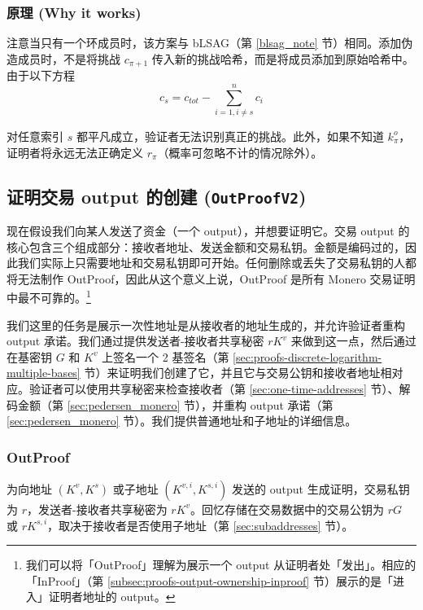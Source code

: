 \subsubsection*{原理 (Why it works)}

注意当只有一个环成员时，该方案与 bLSAG（第 \ref{blsag_note} 节）相同。添加伪造成员时，不是将挑战 $c_{\pi+1}$ 传入新的挑战哈希，而是将成员添加到原始哈希中。由于以下方程\vspace{.175cm}
\[c_{s} = c_{tot} - \sum^{n}_{i=1,i\neq s} c_i\]

对任意索引 $s$ 都平凡成立，验证者无法识别真正的挑战。此外，如果不知道 $k^o_{\pi}$，证明者将永远无法正确定义 $r_{\pi}$（概率可忽略不计的情况除外）。


\subsection{证明交易 output 的创建 ({\tt OutProofV2})}
\label{subsec:proofs-output-creator-outproof}

现在假设我们向某人发送了资金（一个 output），并想要证明它。交易 output 的核心包含三个组成部分：接收者地址、发送金额和交易私钥。金额是编码过的，因此我们实际上只需要地址和交易私钥即可开始。任何删除或丢失了交易私钥的人都将无法制作 OutProof，因此从这个意义上说，OutProof 是所有 Monero 交易证明中最不可靠的。\footnote{我们可以将「OutProof」理解为展示一个 output 从证明者处「发出」。相应的「InProof」（第 \ref{subsec:proofs-output-ownership-inproof} 节）展示的是「进入」证明者地址的 output。}

我们这里的任务是展示一次性地址是从接收者的地址生成的，并允许验证者重构 output 承诺。我们通过提供发送者-接收者共享秘密 $rK^v$ 来做到这一点，然后通过在基密钥 $G$ 和 $K^v$ 上签名一个 2 基签名（第 \ref{sec:proofs-discrete-logarithm-multiple-bases} 节）来证明我们创建了它，并且它与交易公钥和接收者地址相对应。验证者可以使用共享秘密来检查接收者（第 \ref{sec:one-time-addresses} 节）、解码金额（第 \ref{sec:pedersen_monero} 节），并重构 output 承诺（第 \ref{sec:pedersen_monero} 节）。我们提供普通地址和子地址的详细信息。

\subsubsection*{OutProof}

为向地址 $(K^{v},K^{s})$ 或子地址 $(K^{v,i},K^{s,i})$ 发送的 output 生成证明，交易私钥为 $r$，发送者-接收者共享秘密为 $rK^v$。回忆存储在交易数据中的交易公钥为 $rG$ 或 $rK^{s,i}$，取决于接收者是否使用子地址（第 \ref{sec:subaddresses} 节）。

